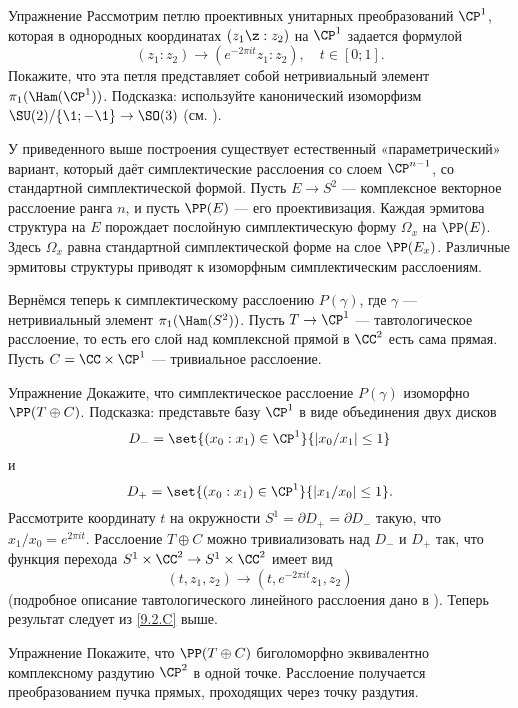 \begin{thm}{Упражнение}\label{9.2.C}
Рассмотрим петлю проективных унитарных преобразований $\CP^1$, которая в однородных координатах $(z_1 \z: z_2)$ на $\CP^1$ задается формулой 
\[(z_1 : z_2 ) \to (e^{-2\pi it} z_1 : z_2 ),\quad t \in [0; 1].\]
Покажите, что эта петля представляет собой нетривиальный элемент $\pi_1 (\Ham(\CP^1 ))$.
Подсказка: используйте канонический изоморфизм $\SU (2)/\{\1; -\1\} \to \SO(3)$ (см. \cite{DFN}).
\end{thm}

У приведенного выше построения существует естественный «параметрический» вариант, который даёт симплектические расслоения со слоем $\CP^{n-1}$, со стандартной симплектической формой.
Пусть $E \to S^2$ --- комплексное векторное расслоение ранга $n$, и пусть $\PP(E)$ --- его проективизация.
Каждая эрмитова структура на $E$ порождает послойную симплектическую форму $\Omega_x$ на $\PP(E)$.
Здесь $\Omega_x$ равна стандартной симплектической форме на слое $\PP(E_x)$.
Различные эрмитовы структуры приводят к изоморфным симплектическим расслоениям.

Вернёмся теперь к симплектическому расслоению $P(\gamma)$, где $\gamma$ --- нетривиальный элемент $\pi_1 (\Ham(S^2 ))$.
Пусть $T \to \CP^1$ --- тавтологическое расслоение,
то есть его слой над комплексной прямой в $\CC^2$ есть сама прямая.
Пусть $C = \CC \times \CP^1$ --- тривиальное расслоение.

\begin{thm}{Упражнение}\label{9.2.D}
Докажите, что симплектическое расслоение $P(\gamma)$ изоморфно $\PP(T \oplus C)$.
Подсказка: представьте базу $\CP^1$ в виде объединения двух дисков 
\[D_- = \set{(x_0 : x_1 ) \in \CP^1}{ |x_0 /x_1 | \le 1}\]
и
\[D_+ = \set{(x_0 : x_1 ) \in \CP^1}{|x_1 /x_0 | \le 1}.\]
Рассмотрите координату $t$ на окружности $S^1 = \partial D_+ = \partial D_-$ такую, что $x_1 /x_0 = e^{2\pi it}$.
Расслоение $T \oplus C$ можно тривиализовать над $D_-$ и $D_+$ так, что функция перехода $S^1 \times \CC^2 \to S^1 \times \CC^2$ имеет вид 
\[(t, z_1, z_2 ) \to (t, e^{-2\pi it} z_1, z_2 )\]
(подробное описание тавтологического линейного расслоения дано в \cite{GH}).
Теперь результат следует из \ref{9.2.C} выше.
\end{thm}

\begin{thm}{Упражнение}\label{9.2.E}
Покажите, что $\PP(T \oplus C)$ биголоморфно эквивалентно комплексному раздутию $\CP^2$ в одной точке.
Расслоение получается  преобразованием пучка прямых, проходящих через точку раздутия.
\end{thm}


